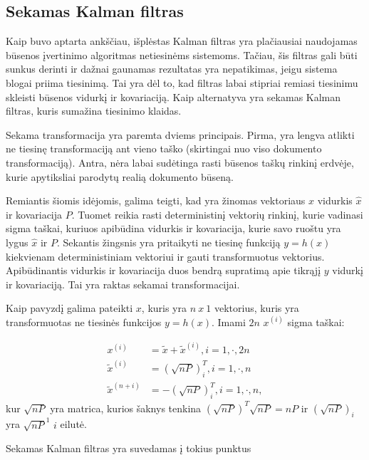 \subsection{Sekamas Kalman filtras}


Kaip buvo aptarta ankščiau, išplėstas Kalman filtras yra plačiausiai naudojamas būsenos įvertinimo algoritmas netiesinėms sistemoms.
Tačiau, šis filtras gali būti sunkus derinti ir dažnai gaunamas rezultatas yra nepatikimas, jeigu sistema blogai priima tiesinimą.
Tai yra dėl to, kad filtras labai stipriai remiasi tiesinimu skleisti būsenos vidurkį ir kovariaciją.
Kaip alternatyva yra sekamas Kalman filtras, kuris sumažina tiesinimo klaidas.

Sekama transformacija yra paremta dviems principais.
Pirma, yra lengva atlikti ne tiesinę transformaciją ant vieno taško (skirtingai nuo viso dokumento transformaciją).
Antra, nėra labai sudėtinga rasti būsenos taškų rinkinį erdvėje, kurie apytiksliai parodytų realią dokumento būseną.

Remiantis šiomis idėjomis, galima teigti, kad yra žinomas vektoriaus $x$ vidurkis $\hat{x}$ ir kovariacija $P$.
Tuomet reikia rasti deterministinį vektorių rinkinį, kurie vadinasi sigma taškai, kuriuos apibūdina vidurkis ir kovariacija, kurie savo ruoštu yra lygus $\hat{x}$ ir $P$.
Sekantis žingsnis yra pritaikyti ne tiesinę funkciją $y = h(x)$ kiekvienam deterministiniam vektoriui ir gauti transformuotus vektorius.
Apibūdinantis vidurkis ir kovariacija duos bendrą supratimą apie tikrąjį $y$ vidurkį ir kovariaciją.
Tai yra raktas sekamai transformacijai.

Kaip pavyzdį galima pateikti $x$, kuris yra $n~x~1$ vektorius, kuris yra transformuotas ne tiesinės funkcijos $y = h(x)$.
Imami $2n$ $x^{(i)}$ sigma taškai:

\begin{equation}
    \begin{aligned}
    x^{(i)} &= \tilde{x} + \tilde{x}^{(i)}, i = 1, \cdot, 2n \\
    \tilde{x}^{(i)} &= (\sqrt{nP})^T_i, i = 1,\cdot,n\\
    \tilde{x}^{(n+i)} &= -(\sqrt{nP})^T_i, i = 1, \cdot, n,
    \end{aligned}
\end{equation}
kur $\sqrt{nP}$ yra matrica, kurios šaknys tenkina $(\sqrt{nP})^T\sqrt{nP} = nP$ ir $(\sqrt{nP})_i$ yra $\sqrt{nP}^1$ $i$ eilutė.

Sekamas Kalman filtras yra suvedamas į tokius punktus


